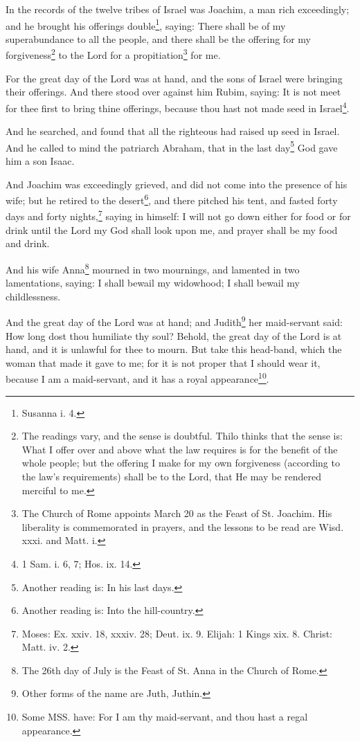 \pstart
{}

\pend\pstart
In the records of the twelve tribes of Israel was Joachim, a man rich exceedingly; and he brought his offerings double\footnote{Susanna i. 4.}, saying: There shall be of my superabundance to all the people, and there shall be the offering for my forgiveness\footnote{The readings vary, and the sense is doubtful. Thilo thinks that the sense is: What I offer over and above what the law requires is for the benefit of the whole people; but the offering I make for my own forgiveness (according to the law's requirements) shall be to the Lord, that He may be rendered merciful to me.} to the Lord for a propitiation\footnote{The Church of Rome appoints March 20 as the Feast of St. Joachim. His liberality is commemorated in prayers, and the lessons to be read are Wisd. xxxi. and Matt. i.} for me.

\pend\pstart
For the great day of the Lord was at hand, and the sons of Israel were bringing their offerings. And there stood over against him Rubim, saying: It is not meet for thee first to bring thine offerings, because thou hast not made seed in Israel\footnote{1 Sam. i. 6, 7; Hos. ix. 14.}.

\pend\pstart
And he searched, and found that all the righteous had raised up seed in Israel. And he called to mind the patriarch Abraham, that in the last day\footnote{Another reading is: In his last days.} God gave him a son Isaac.

\pend\pstart
And Joachim was exceedingly grieved, and did not come into the presence of his wife; but he retired to the desert\footnote{Another reading is: Into the hill-country.}, and there pitched his tent, and fasted forty days and forty nights,\footnote{Moses: Ex. xxiv. 18, xxxiv. 28; Deut. ix. 9. Elijah: 1 Kings xix. 8. Christ: Matt. iv. 2.} saying in himself: I will not go down either for food or for drink until the Lord my God shall look upon me, and prayer shall be my food and drink.

\pend\pstart
{}

\pend\pstart
And his wife Anna\footnote{The 26th day of July is the Feast of St. Anna in the Church of Rome.} mourned in two mournings, and lamented in two lamentations, saying: I shall bewail my widowhood; I shall bewail my childlessness.

\pend\pstart
And the great day of the Lord was at hand; and Judith\footnote{Other forms of the name are Juth, Juthin.} her maid-servant said: How long dost thou humiliate thy soul? Behold, the great day of the Lord is at hand, and it is unlawful for thee to mourn. But take this head-band, which the woman that made it gave to me; for it is not proper that I should wear it, because I am a maid-servant, and it has a royal appearance\footnote{Some MSS. have: For I am thy maid-servant, and thou hast a regal appearance.}.


